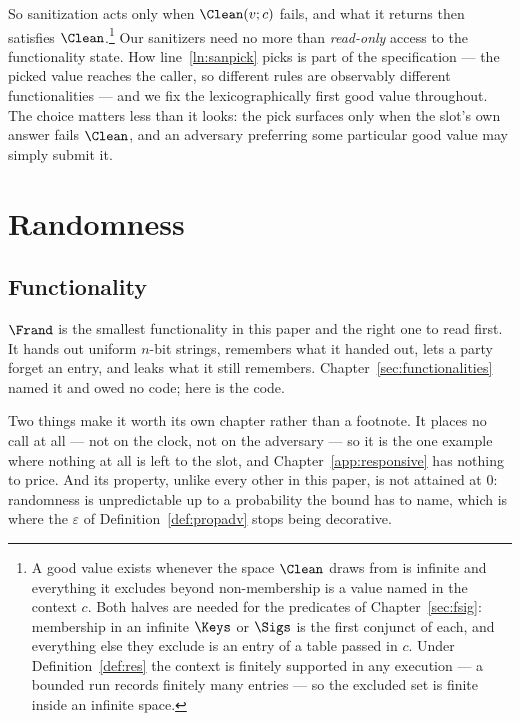 \documentclass[10pt,oneside,openany]{book}
\theoremstyle{accentdef}
\theoremstyle{accentplain}
\begin{document}
So sanitization acts only when $\Clean(v; c)$ fails, and what it returns then satisfies
$\Clean$.\footnote{A good value exists whenever the space $\Clean$ draws from is infinite and
everything it excludes beyond non-membership is a value named in the context $c$. Both halves are
needed for the predicates of Chapter~\ref{sec:fsig}: membership in an infinite $\Keys$ or $\Sigs$
is the first conjunct of each, and everything else they exclude is an entry of a table passed in
$c$. Under Definition~\ref{def:res} the context is finitely supported in any execution --- a
bounded run records finitely many entries --- so the excluded set is finite inside an infinite
space.} Our sanitizers need no more
than \emph{read-only} access to the functionality state. How line~\ref{ln:sanpick} picks is part
of the specification --- the picked value reaches the caller, so different rules are observably
different functionalities --- and we fix the lexicographically first good value throughout. The
choice matters less than it looks: the pick surfaces only when the slot's own answer fails
$\Clean$, and an adversary preferring some particular good value may simply submit it.

\chapter{Randomness}\label{sec:frand}

\section{Functionality}\label{sec:frandfunc}

$\Frand$ is the smallest functionality in this paper and the right one to read first. It hands out
uniform $n$-bit strings, remembers what it handed out, lets a party forget an entry, and leaks
what it still remembers. Chapter~\ref{sec:functionalities} named it and owed no code; here is the
code.

Two things make it worth its own chapter rather than a footnote. It places no call at all --- not
on the clock, not on the adversary --- so it is the one example where nothing at all is left to
the slot, and Chapter~\ref{app:responsive} has nothing to price. And its property, unlike every
other in this paper, is not attained at $0$: randomness is unpredictable up to a probability the
bound has to name, which is where the $\varepsilon$ of Definition~\ref{def:propadv} stops being
decorative.
\end{document}
